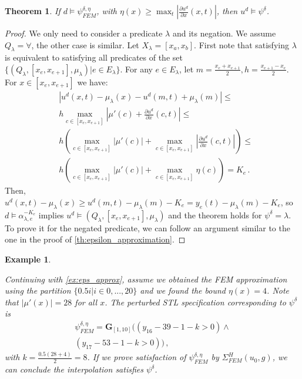 \documentclass[letterpaper, 10 pt, conference]{ieeeconf/ieeeconf}
\newtheorem{theorem}{Theorem}
\newtheorem{example}{Example}
\newcommand{\Always}{\mathbf{G}}
\begin{document}
\begin{theorem}
\label{th:eta_approximation}
    If $d \models \psi^{\delta, \eta}_{FEM}$, with $\eta(x) \geq \max_t |\frac{\partial
    u^d}{\partial x}(x, t)|$, then $u^d \models \psi^\delta$.
\end{theorem}
\begin{proof}
    We only need to consider a predicate $\lambda$ and its negation. We assume
    $Q_\lambda = \forall$, the other case is similar. Let $X_\lambda = [x_a,
    x_b]$. First note that satisfying $\lambda$ is equivalent to satisfying all
    predicates of the set $\{(Q_\lambda, [x_e, x_{e+1}], \mu_\lambda) | e \in
    E_\lambda\}$. For any $e \in E_\lambda$, let $m = \frac{x_e + x_{e+1}}{2}, 
    h = \frac{x_{e+1} - x_{e}}{2}$. 
    For $x \in [x_e, x_{e+1}]$ we have:
    \begin{equation}
    \begin{aligned}
        &|u^d(x, t) - \mu_\lambda(x) - u^d(m, t) + \mu_\lambda(m)| \leq \\
        &h \max_{c \in [x_e, x_{e+1}]} 
        |\mu'(c) + \frac{\partial u^d}{\partial x}(c, t)| \leq \\
        &h \left (  
        \max_{c \in [x_e, x_{e+1}]} |\mu'(c)| +
        \max_{c \in [x_e, x_{e+1}]} |\frac{\partial u^d}{\partial x}(c, t)|
        \right ) \leq \\
        &h \left (  
        \max_{c \in [x_e, x_{e+1}]} |\mu'(c)| +
        \max_{c \in [x_e, x_{e+1}]} \eta(c)
        \right )  = K_e \,.
    \end{aligned}
    \end{equation}
    Then, $u^d(x, t) - \mu_\lambda(x) \geq u^d(m, t) - \mu_\lambda(m) - K_e =
    y_e(t) - \mu_\lambda(m) - K_e$, so $d \models \alpha^{-K_e}_{\lambda, e}$
    implies $u^d \models (Q_\lambda, [x_e, x_{e+1}], \mu_\lambda)$ and the
    theorem holds for $\psi^\delta = \lambda$. To prove it for the negated
    predicate, we can follow an argument similar to the one in the proof of
    \cref{th:epsilon_approximation}.
\end{proof}

\begin{example}
    \label{ex:eta_approx}

    Continuing with \cref{ex:eps_approx}, assume we obtained the FEM
    approximation using the partition $\{0.5 i | i \in 0,...,20\}$ and we found the
    bound $\eta(x) = 4$. Note that $|\mu'(x)| = 28$ for all $x$. The perturbed STL
    specification corresponding to $\psi^\delta$ is
    \begin{multline}
        \psi^{\delta, \eta}_{FEM} = \Always_{[1,10]} \bigl(
            (y_{16} - 39 - 1 - k > 0) \land \\ (y_{17} - 53 - 1 - k > 0)
        \bigr) \,,
    \end{multline}
    with $k = \frac{0.5 (28 + 4)}{2} = 8$. If we prove satisfaction of $\psi^{\delta,
    \eta}_{FEM}$ by $\Sigma^H_{FEM}(u_0, g)$, we can conclude the interpolation satisfies
    $\psi^\delta$.
    
\end{example}
\end{document}
